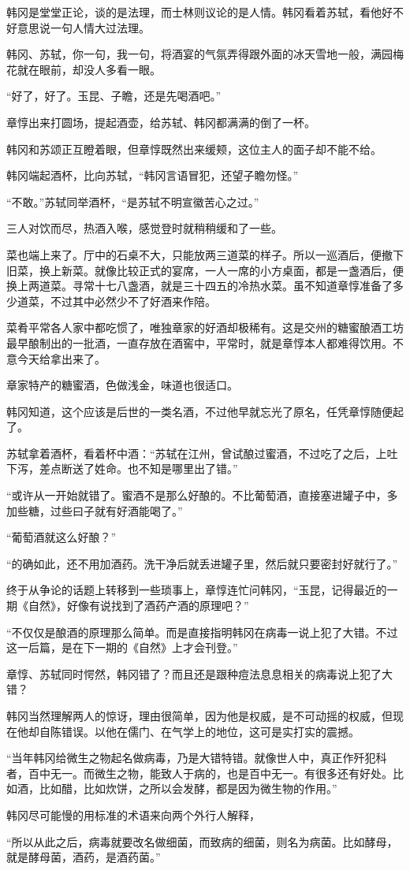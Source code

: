 韩冈是堂堂正论，谈的是法理，而士林则议论的是人情。韩冈看着苏轼，看他好不好意思说一句人情大过法理。

韩冈、苏轼，你一句，我一句，将酒宴的气氛弄得跟外面的冰天雪地一般，满园梅花就在眼前，却没人多看一眼。

“好了，好了。玉昆、子瞻，还是先喝酒吧。”

章惇出来打圆场，提起酒壶，给苏轼、韩冈都满满的倒了一杯。

韩冈和苏颂正互瞪着眼，但章惇既然出来缓颊，这位主人的面子却不能不给。

韩冈端起酒杯，比向苏轼，“韩冈言语冒犯，还望子瞻勿怪。”

“不敢。”苏轼同举酒杯，“是苏轼不明宣徽苦心之过。”

三人对饮而尽，热酒入喉，感觉登时就稍稍缓和了一些。

菜也端上来了。厅中的石桌不大，只能放两三道菜的样子。所以一巡酒后，便撤下旧菜，换上新菜。就像比较正式的宴席，一人一席的小方桌面，都是一盏酒后，便换上两道菜。寻常十七八盏酒，就是三十四五的冷热水菜。虽不知道章惇准备了多少道菜，不过其中必然少不了好酒来作陪。

菜肴平常各人家中都吃惯了，唯独章家的好酒却极稀有。这是交州的糖蜜酿酒工坊最早酿制出的一批酒，一直存放在酒窖中，平常时，就是章惇本人都难得饮用。不意今天给拿出来了。

章家特产的糖蜜酒，色做浅金，味道也很适口。

韩冈知道，这个应该是后世的一类名酒，不过他早就忘光了原名，任凭章惇随便起了。

苏轼拿着酒杯，看着杯中酒：“苏轼在江州，曾试酿过蜜酒，不过吃了之后，上吐下泻，差点断送了姓命。也不知是哪里出了错。”

“或许从一开始就错了。蜜酒不是那么好酿的。不比葡萄酒，直接塞进罐子中，多加些糖，过些曰子就有好酒能喝了。”

“葡萄酒就这么好酿？”

“的确如此，还不用加酒药。洗干净后就丢进罐子里，然后就只要密封好就行了。”

终于从争论的话题上转移到一些琐事上，章惇连忙问韩冈，“玉昆，记得最近的一期《自然》，好像有说找到了酒药产酒的原理吧？”

“不仅仅是酿酒的原理那么简单。而是直接指明韩冈在病毒一说上犯了大错。不过这一后篇，是在下一期的《自然》上才会刊登。”

章惇、苏轼同时愕然，韩冈错了？而且还是跟种痘法息息相关的病毒说上犯了大错？

韩冈当然理解两人的惊讶，理由很简单，因为他是权威，是不可动摇的权威，但现在他却自陈错误。以他在儒门、在气学上的地位，这可是实打实的震撼。

“当年韩冈给微生之物起名做病毒，乃是大错特错。就像世人中，真正作歼犯科者，百中无一。而微生之物，能致人于病的，也是百中无一。有很多还有好处。比如酒，比如醋，比如炊饼，之所以会发酵，都是因为微生物的作用。”

韩冈尽可能慢的用标准的术语来向两个外行人解释，

“所以从此之后，病毒就要改名做细菌，而致病的细菌，则名为病菌。比如酵母，就是酵母菌，酒药，是酒药菌。”

